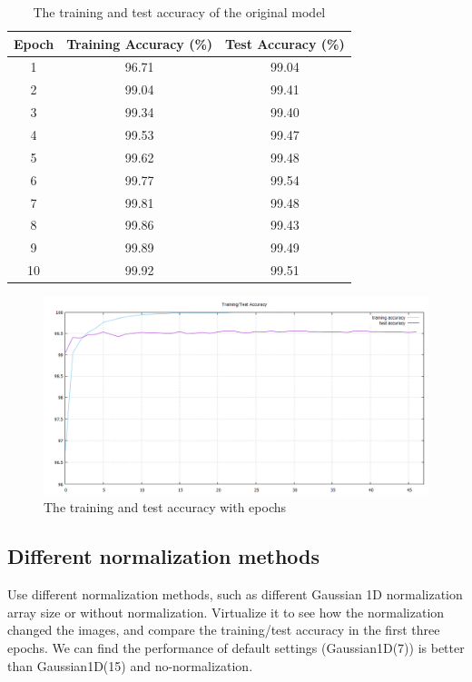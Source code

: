 \documentclass[final]{siamltexmm}
\begin{document}
{\begin{table}[H]
\begin{center}
    \begin{tabular}{| c | c | c |}
    \hline
    Epoch & Training Accuracy (\%) & Test Accuracy (\%) \\ \hline
    1 & 96.71 & 99.04 \\ \hline
    2 & 99.04 & 99.41 \\ \hline
    3 & 99.34 & 99.40 \\ \hline
    4 & 99.53 & 99.47 \\ \hline
    5 & 99.62 & 99.48 \\ \hline
    6 & 99.77 & 99.54 \\ \hline
    7 & 99.81 & 99.48 \\ \hline
    8 & 99.86 & 99.43 \\ \hline  
    9 & 99.89 & 99.49 \\ \hline
    10 & 99.92 & 99.51 \\ \hline      
    \end{tabular}
\end{center}
\caption{The training and test accuracy of the original model}
\end{table}

\begin{figure}[H]
  \centering
    \includegraphics[width=1\textwidth]{../fig/accuracy_org.png}
  \caption{The training and test accuracy with epochs}
\end{figure}


\subsection{Different normalization methods}
Use different normalization methods, such as different Gaussian 1D normalization array size or without normalization. 
Virtualize it to see how the normalization changed the images, and compare the training/test accuracy in the first three epochs.
We can find the performance of default settings (Gaussian1D(7)) is better than Gaussian1D(15) and no-normalization. 

}
\end{document}
